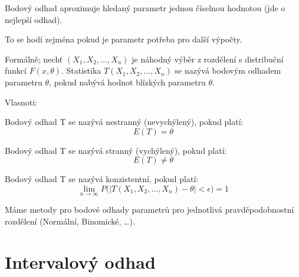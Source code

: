 \begin{compactitem}
    \item Bodový odhad aproximuje hledaný parametr jednou číselnou hodnotou (jde o nejlepší odhad). \begin{compactitem}
        \item To se hodí zejména pokud je parametr potřeba pro další výpočty.
    \end{compactitem}

    \item Formálně; nechť $(X_1, X_2, \ldots, X_n)$ je náhodný výběr z rozdělení s distribuční funkcí $F( x, \theta)$. Statistika $T(X_1, X_2, \ldots, X_n)$ se nazývá bodovým odhadem parametru $\theta$, pokud nabývá hodnot blízkých parametru $\theta$.

    \item Vlasnoti: \begin{compactitem}
        \item Bodový odhad T se nazývá nestranný (nevychýlený), pokud platí:
        $$ E(T) = \theta $$
        \item Bodový odhad T se nazývá stranný (vychýlený), pokud platí:
        $$ E(T) \not= \theta $$
        \item Bodový odhad T se nazývá konzistentní, pokud platí:
        $$ \lim_{n \rightarrow \infty}{P(|T(X_1, X_2, \ldots, X_n) - \theta|} < \epsilon) = 1 $$
    \end{compactitem}

    \item Máme metody pro bodové odhady parametrů pro jednotlivá pravděpodobnostní rozdělení (Normální, Binomické, \dots).
\end{compactitem}


\section{Intervalový odhad}

